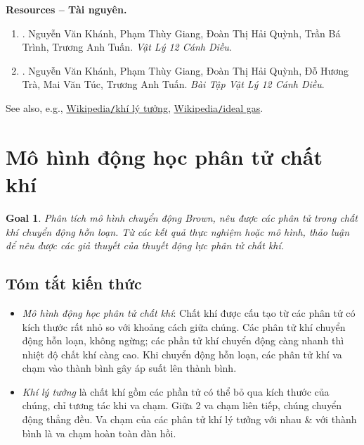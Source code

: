 \documentclass{article}
\newtheorem{goal}{Goal}
\begin{document}
\noindent\textbf{\textsf{Resources -- Tài nguyên.}}
\begin{enumerate}
	\item \cite[Chủ đề 2: {\it Khí Lý Tưởng}]{SGK_Vat_Ly_12_CD}. {\sc Nguyễn Văn Khánh, Phạm Thùy Giang, Đoàn Thị Hải Quỳnh, Trần Bá Trình, Trương Anh Tuấn}. {\it Vật Lý 12 Cánh Diều}.
	
	\item \cite[Chủ đề 1: {\it Khí Lý Tưởng}]{SBT_Vat_Ly_12_CD}. {\sc Nguyễn Văn Khánh, Phạm Thùy Giang, Đoàn Thị Hải Quỳnh, Đỗ Hương Trà, Mai Văn Túc, Trương Anh Tuấn}. {\it Bài Tập Vật Lý 12 Cánh Diều}.
\end{enumerate}
See also, e.g., \href{https://vi.wikipedia.org/wiki/Kh%C3%AD_l%C3%BD_t%C6%B0%E1%BB%9Fng}{Wikipedia{\tt/}khí lý tưởng}, \href{https://en.wikipedia.org/wiki/Ideal_gas}{Wikipedia{\tt/}ideal gas}.


\section{Mô hình động học phân tử chất khí}

\begin{goal}
	Phân tích mô hình chuyển động Brown, nêu được các phân tử trong chất khí chuyển động hỗn loạn. Từ các kết quả thực nghiệm hoặc mô hình, thảo luận để nêu được các giả thuyết của thuyết động lực phân tử chất khí.
\end{goal}

\subsection{Tóm tắt kiến thức}

\begin{itemize}
	\item {\it Mô hình động học phân tử chất khí}: Chất khí được cấu tạo từ các phân tử có kích thước rất nhỏ so với khoảng cách giữa chúng. Các phân tử khí chuyển động hỗn loạn, không ngừng; các phần tử khí chuyển động càng nhanh thì nhiệt độ chất khí càng cao. Khi chuyển động hỗn loạn, các phân tử khí va chạm vào thành bình gây áp suất lên thành bình.
	\item {\it Khí lý tưởng} là chất khí gồm các phần tử có thể bỏ qua kích thước của chúng, chỉ tương tác khi va chạm. Giữa 2 va chạm liên tiếp, chúng chuyển động thẳng đều. Va chạm của các phân tử khí lý tưởng với nhau \& với thành bình là va chạm hoàn toàn đàn hồi.
\end{itemize}
\end{document}
